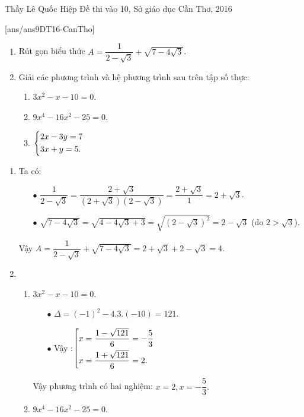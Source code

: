 \begin{name}
{Thầy Lê Quốc Hiệp}
{Đề thi vào 10, Sở giáo dục Cần Thơ, 2016}
\end{name}
\setcounter{ex}{0}
[ans/ans9DT16-CanTho]
\begin{ex}%
    \hfill
    \begin{enumerate}[1.]
        \item Rút gọn biểu thức $A=\dfrac{1}{2-\sqrt{3}}+\sqrt{7-4\sqrt{3}}$.
        \item Giải các phương trình và hệ phương trình sau trên tập số thực: 
        	\begin{enumerate}
        		\item $3x^2-x-10=0$.
        		\item $9x^4-16x^2-25=0$.
        		\item  $\left\{\begin{aligned}&2x-3y=7\\&3x+y=5.\end{aligned}\right.$
        	\end{enumerate}
    \end{enumerate}
\loigiai
    {
    \begin{enumerate}[1.]
        \item Ta có:
        	\begin{enumerate}
        		\item[$\bullet$]$\dfrac{1}{2-\sqrt{3}}=\dfrac{2+\sqrt{3}}{(2+\sqrt{3})(2-\sqrt{3})}=\dfrac{2+\sqrt{3}}{1}=2+\sqrt{3}$.
        		\item[$\bullet$]$\sqrt{7-4\sqrt{3}}=\sqrt{4-4\sqrt{3}+3}=\sqrt{(2-\sqrt{3})^2}=2-\sqrt{3}$ (do $2>\sqrt{3}$).
        	\end{enumerate}
        Vậy $A=\dfrac{1}{2-\sqrt{3}}+\sqrt{7-4\sqrt{3}}=2+\sqrt{3}+2-\sqrt{3}=4$.
        \item 
        	\begin{enumerate}
        		\item $3x^2-x-10=0$.
        			\begin{enumerate}
        				\item[$\bullet$]$\Delta=(-1)^2-4.3.(-10)=121$.
        				\item[$\bullet$]Vậy :$\left[\begin{aligned}&x=\dfrac{1-\sqrt{121}}{6}=-\dfrac{5}{3}\\&x=\dfrac{1+\sqrt{121}}{6}=2.\end{aligned}\right.$
        			\end{enumerate}	
        		Vậy phương trình có hai nghiệm: $x=2, x=-\dfrac{5}{3}.$
        		\item $9x^4-16x^2-25=0$.
        			\begin{enumerate}

\end{enumerate}
\end{enumerate}
\end{enumerate}}
\end{ex}
